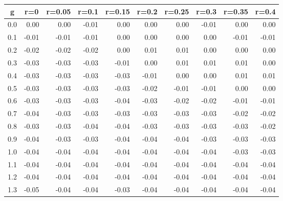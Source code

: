 %
\begin{table}[!tbp]
 \begin{center}
 \begin{tabular}{rrrrrrrrrr}\hline\hline
\multicolumn{1}{c}{g}&\multicolumn{1}{c}{r=0}&\multicolumn{1}{c}{r=0.05}&\multicolumn{1}{c}{r=0.1}&\multicolumn{1}{c}{r=0.15}&\multicolumn{1}{c}{r=0.2}&\multicolumn{1}{c}{r=0.25}&\multicolumn{1}{c}{r=0.3}&\multicolumn{1}{c}{r=0.35}&\multicolumn{1}{c}{r=0.4}\tabularnewline
\hline
0.0& 0.00& 0.00&-0.01& 0.00& 0.00& 0.00&-0.01& 0.00& 0.00\tabularnewline
0.1&-0.01&-0.01&-0.01& 0.00& 0.00& 0.00& 0.00&-0.01&-0.01\tabularnewline
0.2&-0.02&-0.02&-0.02& 0.00& 0.01& 0.01& 0.00& 0.00& 0.00\tabularnewline
0.3&-0.03&-0.03&-0.03&-0.01& 0.00& 0.01& 0.01& 0.01& 0.00\tabularnewline
0.4&-0.03&-0.03&-0.03&-0.03&-0.01& 0.00& 0.00& 0.01& 0.01\tabularnewline
0.5&-0.03&-0.03&-0.03&-0.03&-0.02&-0.01&-0.01& 0.00& 0.00\tabularnewline
0.6&-0.03&-0.03&-0.03&-0.04&-0.03&-0.02&-0.02&-0.01&-0.01\tabularnewline
0.7&-0.04&-0.03&-0.03&-0.03&-0.03&-0.03&-0.03&-0.02&-0.02\tabularnewline
0.8&-0.03&-0.03&-0.04&-0.04&-0.03&-0.03&-0.03&-0.03&-0.02\tabularnewline
0.9&-0.04&-0.03&-0.03&-0.04&-0.04&-0.04&-0.03&-0.03&-0.03\tabularnewline
1.0&-0.04&-0.04&-0.04&-0.04&-0.04&-0.04&-0.04&-0.03&-0.03\tabularnewline
1.1&-0.04&-0.04&-0.04&-0.04&-0.04&-0.04&-0.04&-0.04&-0.04\tabularnewline
1.2&-0.04&-0.04&-0.04&-0.04&-0.04&-0.04&-0.04&-0.04&-0.04\tabularnewline
1.3&-0.05&-0.04&-0.04&-0.03&-0.04&-0.04&-0.04&-0.04&-0.04\tabularnewline
\hline
\end{tabular}

\end{center}

\end{table}

